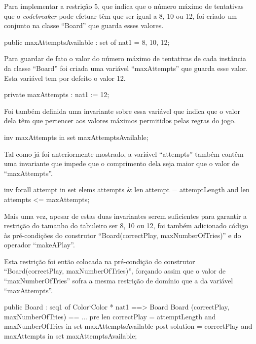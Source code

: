 Para implementar a restrição 5, que indica que o número máximo de
tentativas que o \emph{codebreaker} pode efetuar têm que ser igual a 8, 10 ou
12, foi criado um conjunto na classe ``Board'' que guarda esses
valores.

\begin{vdm_al}
  public maxAttemptsAvailable : set of nat1 = {8, 10, 12};
\end{vdm_al}

Para guardar de fato o valor do número máximo de tentativas de cada
instância da classe ``Board'' foi criada uma variável ``maxAttempts''
que guarda esse valor. Esta variável tem por defeito o valor 12.

\begin{vdm_al}
  private maxAttempts : nat1 := 12;
\end{vdm_al}

Foi também definida uma invariante sobre essa variável que indica que
o valor dela têm que pertencer aos valores máximos permitidos pelas
regras do jogo.

\begin{vdm_al}
  inv maxAttempts in set maxAttemptsAvailable;
\end{vdm_al}

Tal como já foi anteriormente mostrado, a variável ``attempts'' também
contêm uma invariante que impede que o comprimento dela seja maior que
o valor de ``maxAttempts''.

\begin{vdm_al}
  inv forall attempt in set elems attempts & len attempt = attemptLength and
    len attempts <= maxAttempts;
\end{vdm_al}

Mais uma vez, apesar de estas duas invariantes serem suficientes para
garantir a restrição do tamanho do tabuleiro ser 8, 10 ou 12, foi
também adicionado código às pré-condições do construtor
``Board(correctPlay, maxNumberOfTries)'' e do operador ``makeAPlay''.

Esta restrição foi então colocada na pré-condição do construtor
``Board(correctPlay, maxNumberOfTries)'', forçando assim que o valor
de ``maxNumberOfTries'' sofra a mesma restrição de domínio que a da
variável ``maxAttempts''.

\begin{vdm_al}
  public Board : seq1 of Color`Color * nat1 ==> Board
  Board (correctPlay, maxNumberOfTries) == ...
  pre len correctPlay = attemptLength and
    maxNumberOfTries in set maxAttemptsAvailable
  post solution = correctPlay and
    maxAttempts in set maxAttemptsAvailable;
\end{vdm_al}

